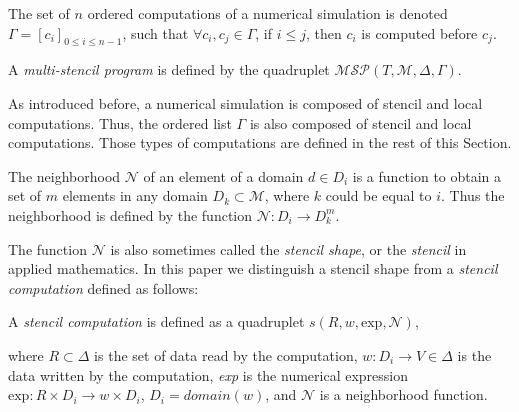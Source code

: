 
\begin{mydef}
The set of $n$ ordered computations of a numerical simulation is denoted $\Gamma = [c_i]_{0 \leq i \leq n-1}$, such that $\forall c_i,c_j \in \Gamma$, if $i \leq j$, then $c_i$ is computed before $c_j$.
\end{mydef}

\begin{mydef}
A \textit{multi-stencil program} is defined by the quadruplet $\mathcal{MSP}(T,\mathcal{M},\Delta,\Gamma)$.
\end{mydef}

As introduced before, a numerical simulation is composed of stencil and local computations. Thus, the ordered list $\Gamma$ is also composed of stencil and local computations. Those types of computations are defined in the rest of this Section.

\begin{mydef}
The neighborhood $\mathcal{N}$ of an element of a domain $d \in D_i$ is a function to obtain a set of $m$ elements in any domain $D_k \subset \mathcal{M}$, where $k$ could be equal to $i$. Thus the neighborhood is defined by the function $\mathcal{N} : D_i \rightarrow D_k^m$.
\end{mydef}
The function $\mathcal{N}$ is also sometimes called the \textit{stencil shape}, or the \textit{stencil} in applied mathematics. In this paper we distinguish a stencil shape from a \textit{stencil computation} defined as follows:

\begin{mydef}
A \textit{stencil computation} is defined as a quadruplet $s(R,w,\text{exp},\mathcal{N})$,
\end{mydef}
where $R \subset \Delta$ is the set of data read by the computation, $w : D_i \rightarrow V \in \Delta$ is the data written by the computation, \textit{exp} is the numerical expression $\text{exp} : R \times D_i \rightarrow w \times D_i$, $D_i=domain(w)$, and $\mathcal{N}$ is a neighborhood function.

